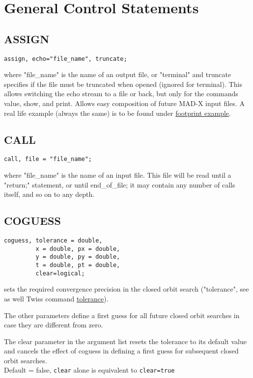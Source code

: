 %
\section{General Control Statements}

\subsection{ASSIGN}
\begin{verbatim}
assign, echo="file_name", truncate;
\end{verbatim} 
where "file\_name" is the name of an output file, or "terminal" and
truncate specifies if the file must be truncated when opened (ignored
for terminal). This allows switching the echo stream to a file or back,
but only for the commands value, show, and print. Allows easy
composition of future MAD-X input files. A real life example (always the
same) is to be found under \href{foot.html}{footprint example}.  

\subsection{CALL}
\begin{verbatim}
call, file = "file_name";
\end{verbatim} 
where "file\_name"  is the name of an input file. This file will be read
until a "return;" statement, or until end\_of\_file; it may contain any
number of calls itself, and so on to any depth.  

\subsection{COGUESS}
\label{subsec:general_coguess}
\begin{verbatim}
coguess, tolerance = double, 
         x = double, px = double, 
         y = double, py = double, 
         t = double, pt = double,
         clear=logical;
\end{verbatim} 
sets the required convergence precision in the closed orbit search
("tolerance", see as well Twiss command
\href{../twiss/twiss.html#tolerance}{tolerance}).  

The other parameters define a first guess for all future closed orbit
searches in case they are different from zero.  

The clear parameter in the argument list resets the tolerance to its default value 
and cancels the effect of coguess in defining a first guess for subsequent 
closed orbit searches. \\
Default = false, {\tt clear} alone is equivalent to {\tt clear=true}

